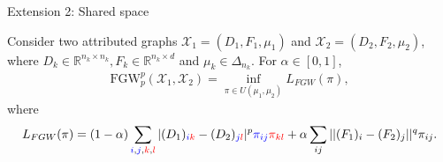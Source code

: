 \documentclass{beamer}
\newcommand{\fgw}{\text{FGW}}
\newcommand{\cX}{\mathcal X}
\newcommand{\bbR}{\mathbb R}
\begin{document}
\begin{frame}{Extension 2: Shared space}
  \scriptsize
  \begin{definition}
    Consider two attributed graphs $\cX_1 = (D_1, F_1, \mu_1)$ and
    $\cX_2 = (D_2, F_2, \mu_2)$,
    where $D_k \in \bbR^{n_k \times n_k}, F_k \in \bbR^{n_k \times d}$
    and $\mu_k \in \Delta_{n_k}$. For $\alpha \in [0, 1]$,
    \begin{align*}
      \fgw_p^p(\cX_1, \cX_2) = \inf_{\pi \in U(\mu_1, \mu_2)} L_{FGW}(\pi),
    \end{align*}
    \vspace{-0.3cm}
    where
    \begin{align*}
      L_{FGW}(\pi) = (1 - \alpha)
      \sum_{{\color{blue}{i}},{\color{blue}{j}},{\color{red}{k}},{\color{red}{l}}}
      |(D_1)_{{\color{blue}{i}} {\color{red}{k}}} - (D_2)_{{\color{blue}{j}}{\color{red}{l}}}|^p {\color{blue}{\pi_{ij}}} {\color{red}{\pi_{kl}}}
      + \alpha \sum_{ij} ||(F_1)_i - (F_2)_j||^q \pi_{ij}.
    \end{align*}
  \end{definition}



\end{frame}
\end{document}
